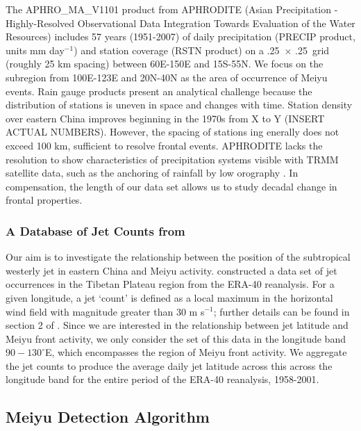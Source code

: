 \documentclass[draft,grl]{AGUTeX}
\begin{document}
\begin{article}
	The APHRO\_MA\_V1101 product from APHRODITE (Asian Precipitation - Highly-Resolved Observational Data Integration Towards Evaluation of the Water Resources) \citep{Yatagai2012} includes 57 years (1951-2007) of daily precipitation (PRECIP product, units mm day$^{-1}$) and station coverage (RSTN product) on a .25\textdegree\ $\times$ .25\textdegree\ grid (roughly 25 km spacing) between 60\textdegree E-150\textdegree E and 15\textdegree S-55\textdegree N. We focus on the subregion from 100E-123E and 20N-40N as the area of occurrence of Meiyu events. Rain gauge products present an analytical challenge because the distribution of stations is uneven in space and changes with time. Station density over eastern China improves beginning in the 1970s from X to Y (INSERT ACTUAL NUMBERS). However, the spacing of stations ing enerally does not exceed 100 km, sufficient to resolve frontal events. APHRODITE lacks the resolution to show characteristics of precipitation systems visible with TRMM satellite data, such as the anchoring of rainfall by low orography \citep{Xu2009}. In compensation, the length of our data set allows us to study decadal change in frontal properties.
	
\subsubsection{A Database of Jet Counts from \citep{Schiemann2009}} 

	Our aim is to investigate the relationship between the position of the subtropical westerly jet in eastern China and Meiyu activity. \citep{Schiemann2009} constructed a data set of jet occurrences in the Tibetan Plateau region from the ERA-40 reanalysis.  For a given longitude, a jet `count'  is defined as a local maximum in the horizontal wind field with magnitude greater than $30$ m s$^{-1}$; further details can be found in section 2 of \citep{Schiemann2009}. Since we are interested in the relationship between jet latitude and Meiyu front activity, we only consider the set of this data in the longitude band $90-130^\circ$E, which encompasses the region of Meiyu front activity. We aggregate the jet counts to produce the average daily jet latitude across this across the longitude band for the entire period of the ERA-40 reanalysis, 1958-2001. 
	
\subsection{Meiyu Detection Algorithm}


\end{article}
\end{document}
